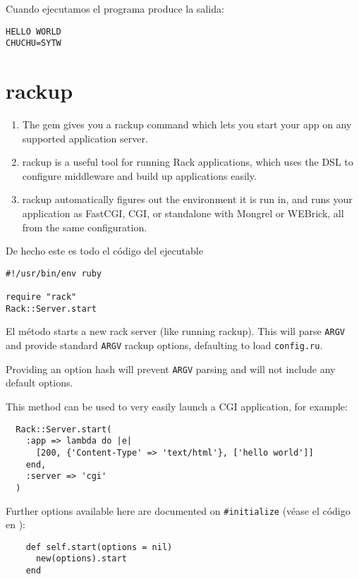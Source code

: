 Cuando ejecutamos el programa produce la salida:
\begin{verbatim}
HELLO WORLD
CHUCHU=SYTW
\end{verbatim}

\section{rackup}


\begin{enumerate}
\item 
The \Rack{} gem gives you a 
rackup command which lets you start your app on
any supported application server. 

\item 
rackup is a useful tool for
running Rack applications, which uses the \rackbuilder{} DSL to
configure middleware and build up applications easily. 

\item 
rackup
automatically figures out the environment it is run in, and runs
your application as FastCGI, CGI, or standalone with Mongrel or
WEBrick, all from the same configuration.
\end{enumerate}

De hecho este es todo el código del ejecutable 
\begin{verbatim}
#!/usr/bin/env ruby

require "rack"
Rack::Server.start
\end{verbatim}

El método 
starts a new rack server (like running rackup). This will parse \verb|ARGV| and
provide standard \verb|ARGV| rackup options, defaulting to load \verb'config.ru'.

Providing an option hash will prevent \verb|ARGV| parsing and will not include
any default options.

This method can be used to very easily launch a CGI application, for
example:

\begin{verbatim}
  Rack::Server.start(
    :app => lambda do |e|
      [200, {'Content-Type' => 'text/html'}, ['hello world']]
    end,
    :server => 'cgi'
  )
\end{verbatim}

Further options available here are documented on \rackserver{}\verb|#initialize|
(véase el código en \rackserversrc{}):
\begin{verbatim}
    def self.start(options = nil)
      new(options).start
    end
\end{verbatim}

